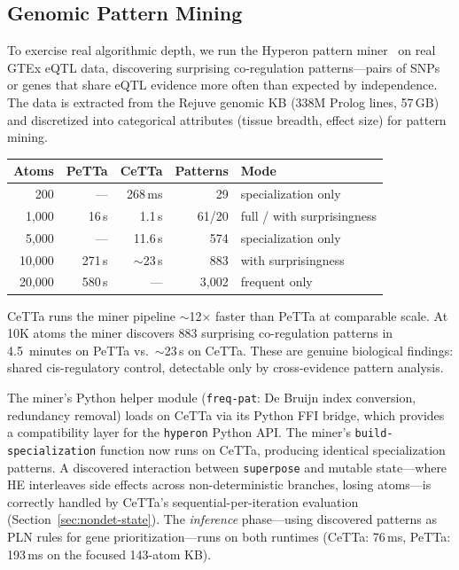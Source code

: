 \documentclass[11pt]{article}
\newcommand{\code}[1]{\texttt{#1}}
\newcommand{\PeTTa}{\textup{PeTTa}}
\newcommand{\HE}{\textup{HE}}
\newcommand{\CeTTa}{\textup{CeTTa}}
\begin{document}
\subsection{Genomic Pattern Mining}

To exercise real algorithmic depth, we run the Hyperon pattern
miner~\cite{metta} on real GTEx eQTL data, discovering surprising
co-regulation patterns---pairs of SNPs or genes that share eQTL
evidence more often than expected by independence.  The data is
extracted from the Rejuve genomic KB (338M Prolog lines, 57\,GB)
and discretized into categorical attributes (tissue breadth, effect
size) for pattern mining.

\begin{center}
\begin{tabular}{rrrrl}
\toprule
Atoms & \PeTTa{} & \CeTTa{} & Patterns & Mode \\
\midrule
200    & ---      & 268\,ms  &  29 & specialization only \\
1{,}000  & 16\,s   & 1.1\,s  & 61/20  & full / with surprisingness \\
5{,}000  & ---     & 11.6\,s  & 574 & specialization only \\
10{,}000 & 271\,s  & $\sim$23\,s & 883 & with surprisingness \\
20{,}000 & 580\,s  & ---     & 3{,}002 & frequent only \\
\bottomrule
\end{tabular}
\end{center}

\CeTTa{} runs the miner pipeline $\sim$12$\times$ faster than \PeTTa{}
at comparable scale.  At 10K atoms the miner discovers 883 surprising
co-regulation patterns in 4.5~minutes on \PeTTa{} vs.\ $\sim$23\,s on
\CeTTa{}.  These are genuine biological findings: shared cis-regulatory
control, detectable only by cross-evidence pattern analysis.

The miner's Python helper module (\code{freq-pat}: De Bruijn index
conversion, redundancy removal) loads on \CeTTa{} via its Python FFI
bridge, which provides a compatibility layer for the \code{hyperon}
Python API\@.  The miner's \code{build-specialization} function now
runs on \CeTTa{}, producing identical specialization patterns.
A discovered interaction between \code{superpose} and mutable
state---where \HE{} interleaves side effects across non-deterministic
branches, losing atoms---is correctly handled by \CeTTa{}'s
sequential-per-iteration evaluation (Section~\ref{sec:nondet-state}).
The \emph{inference} phase---using discovered patterns as PLN rules
for gene prioritization---runs on both runtimes (\CeTTa{}: 76\,ms,
\PeTTa{}: 193\,ms on the focused 143-atom KB).
\end{document}
